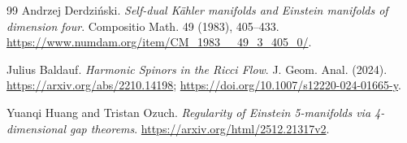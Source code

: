 \documentclass[UTF8,fontset=fandol,zihao=-4]{ctexart}
\theoremstyle{cn}
\begin{document}
\begin{thebibliography}{99}
 Andrzej Derdziński. \emph{Self-dual Kähler manifolds and Einstein manifolds of dimension four}. Compositio Math. 49 (1983), 405--433. \url{https://www.numdam.org/item/CM_1983__49_3_405_0/}.

 Julius Baldauf. \emph{Harmonic Spinors in the Ricci Flow}. J. Geom. Anal. (2024). \url{https://arxiv.org/abs/2210.14198}; \url{https://doi.org/10.1007/s12220-024-01665-y}.

 Yuanqi Huang and Tristan Ozuch. \emph{Regularity of Einstein 5-manifolds via 4-dimensional gap theorems}. \url{https://arxiv.org/html/2512.21317v2}.

\end{thebibliography}
\end{document}

